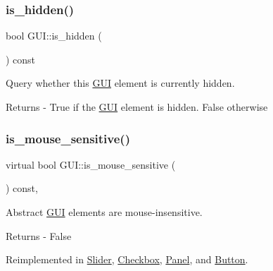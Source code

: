 \subsubsection{\texorpdfstring{is\+\_\+hidden()}{is\_hidden()}}
{\footnotesize\ttfamily bool G\+U\+I\+::is\+\_\+hidden (\begin{DoxyParamCaption}{ }\end{DoxyParamCaption}) const}

Query whether this \mbox{\hyperlink{class_g_u_i}{G\+UI}} element is currently hidden. \begin{DoxyReturn}{Returns}
-\/ True if the \mbox{\hyperlink{class_g_u_i}{G\+UI}} element is hidden. False otherwise 
\end{DoxyReturn}
\mbox{\label{class_g_u_i_aff34edd65faff6f3e908070a2060f6b8}} 
\subsubsection{\texorpdfstring{is\+\_\+mouse\+\_\+sensitive()}{is\_mouse\_sensitive()}}
{\footnotesize\ttfamily virtual bool G\+U\+I\+::is\+\_\+mouse\+\_\+sensitive (\begin{DoxyParamCaption}{ }\end{DoxyParamCaption}) const\hspace{0.3cm}{\ttfamily [inline]}, {\ttfamily [virtual]}}

Abstract \mbox{\hyperlink{class_g_u_i}{G\+UI}} elements are mouse-\/insensitive. \begin{DoxyReturn}{Returns}
-\/ False 
\end{DoxyReturn}


Reimplemented in \mbox{\hyperlink{class_slider_a8d7d12aa4bc5d26de46790b43116bcc1}{Slider}}, \mbox{\hyperlink{class_checkbox_a63fc27bae94d81d4dee8cd2d0e474d2b}{Checkbox}}, \mbox{\hyperlink{class_panel_a607fe6e1be6fd056f199fa817a4dedda}{Panel}}, and \mbox{\hyperlink{class_button_aa2b16ae30fe74f215aa79c699bbf8510}{Button}}.

\mbox{\label{class_g_u_i_a82dd699bec9d845e5bde59f515858f50}} 
